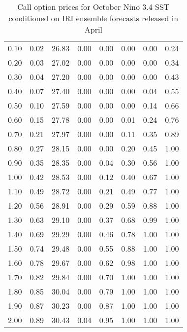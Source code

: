 \begin{table*}[ht]
\begin{tabular}{rrrrrrrr}
  0.10 & 0.02 & 26.83 & 0.00 & 0.00 & 0.00 & 0.00 & 0.24 \\ 
  0.20 & 0.03 & 27.02 & 0.00 & 0.00 & 0.00 & 0.00 & 0.34 \\ 
  0.30 & 0.04 & 27.20 & 0.00 & 0.00 & 0.00 & 0.00 & 0.43 \\ 
  0.40 & 0.07 & 27.40 & 0.00 & 0.00 & 0.00 & 0.04 & 0.55 \\ 
  0.50 & 0.10 & 27.59 & 0.00 & 0.00 & 0.00 & 0.14 & 0.66 \\ 
  0.60 & 0.15 & 27.78 & 0.00 & 0.00 & 0.01 & 0.24 & 0.76 \\ 
  0.70 & 0.21 & 27.97 & 0.00 & 0.00 & 0.11 & 0.35 & 0.89 \\ 
  0.80 & 0.27 & 28.15 & 0.00 & 0.00 & 0.20 & 0.45 & 1.00 \\ 
  0.90 & 0.35 & 28.35 & 0.00 & 0.04 & 0.30 & 0.56 & 1.00 \\ 
  1.00 & 0.42 & 28.53 & 0.00 & 0.12 & 0.40 & 0.67 & 1.00 \\ 
  1.10 & 0.49 & 28.72 & 0.00 & 0.21 & 0.49 & 0.77 & 1.00 \\ 
  1.20 & 0.56 & 28.91 & 0.00 & 0.29 & 0.59 & 0.88 & 1.00 \\ 
  1.30 & 0.63 & 29.10 & 0.00 & 0.37 & 0.68 & 0.99 & 1.00 \\ 
  1.40 & 0.69 & 29.29 & 0.00 & 0.46 & 0.78 & 1.00 & 1.00 \\ 
  1.50 & 0.74 & 29.48 & 0.00 & 0.55 & 0.88 & 1.00 & 1.00 \\ 
  1.60 & 0.78 & 29.67 & 0.00 & 0.62 & 0.98 & 1.00 & 1.00 \\ 
  1.70 & 0.82 & 29.84 & 0.00 & 0.70 & 1.00 & 1.00 & 1.00 \\ 
  1.80 & 0.85 & 30.04 & 0.00 & 0.79 & 1.00 & 1.00 & 1.00 \\ 
  1.90 & 0.87 & 30.23 & 0.00 & 0.87 & 1.00 & 1.00 & 1.00 \\ 
  2.00 & 0.89 & 30.43 & 0.04 & 0.95 & 1.00 & 1.00 & 1.00 \\ 
   \hline
\end{tabular}
\caption{Call option prices for October Nino 3.4 SST conditioned on IRI ensemble forecasts released in April} 
\end{table*}

